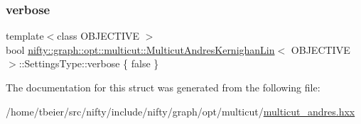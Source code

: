 \subsubsection{\texorpdfstring{verbose}{verbose}}
{\footnotesize\ttfamily template$<$class O\+B\+J\+E\+C\+T\+I\+VE $>$ \\
bool \hyperlink{classnifty_1_1graph_1_1opt_1_1multicut_1_1MulticutAndresKernighanLin}{nifty\+::graph\+::opt\+::multicut\+::\+Multicut\+Andres\+Kernighan\+Lin}$<$ O\+B\+J\+E\+C\+T\+I\+VE $>$\+::Settings\+Type\+::verbose \{ false \}}



The documentation for this struct was generated from the following file\+:\begin{DoxyCompactItemize}
\item 
/home/tbeier/src/nifty/include/nifty/graph/opt/multicut/\hyperlink{multicut__andres_8hxx}{multicut\+\_\+andres.\+hxx}\end{DoxyCompactItemize}

